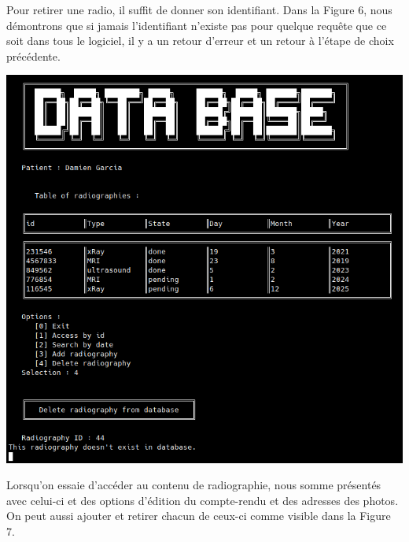 \documentclass[12pt,a4paper]{article}
\newenvironment{Figure}
{\par\medskip\noindent\minipage{\linewidth}}
{\endminipage\par\medskip}
\begin{document}
\begin{multicols}{2}
		Pour retirer une radio, il suffit de donner son identifiant. Dans la Figure 6, nous démontrons que si jamais l'identifiant n'existe pas pour quelque requête que ce soit dans tous le logiciel, il y a un retour d'erreur et un retour à l'étape de choix précédente. \\
		
		\begin{Figure}
			\centering
			\includegraphics[width=\linewidth]{images/walkthrough/doctor_patient_remove_err.png}
			\label{fig:err_del_patient}
		\end{Figure}
		
		Lorsqu'on essaie d'accéder au contenu de radiographie, nous somme présentés avec celui-ci et des options d'édition du compte-rendu et des adresses des photos. On peut aussi ajouter et retirer chacun de ceux-ci comme visible dans la Figure 7. \\
		

\end{multicols}
\end{document}
